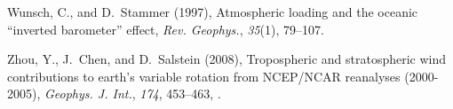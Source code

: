 \documentclass[draft,jgrga]{agutex}
\begin{document}
\begin{article}
\begin{thebibliography}{38}
Wunsch, C., and D.~Stammer (1997), Atmospheric loading and the oceanic
  ``inverted barometer'' effect, \textit{Rev. Geophys.}, \textit{35}(1),
  79--107.

Zhou, Y., J.~Chen, and D.~Salstein (2008), Tropospheric and stratospheric wind
  contributions to earth's variable rotation from {NCEP/NCAR} reanalyses
  (2000-2005), \textit{Geophys. J. Int.}, \textit{174}, 453--463,
  .

\end{thebibliography}






%

%
%
\end{article}

\newpage
\end{document}
